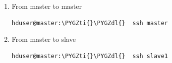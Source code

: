 \documentclass[letterpaper,10pt,english]{sphinxmanual}
\def\PYGZdl{\char`\$}
\def\PYGZti{\char`\~}
\begin{document}
\begin{enumerate}
\item {} 
From master to master

\begin{Verbatim}[commandchars=\\\{\}]
hduser@master:\PYGZti{}\PYGZdl{}  ssh master
\end{Verbatim}

\end{enumerate}
\begin{figure}[htbp]
\centering

\end{figure}
\begin{enumerate}
\setcounter{enumi}{1}
\item {} 
From master to slave

\begin{Verbatim}[commandchars=\\\{\}]
hduser@master:\PYGZti{}\PYGZdl{}  ssh slave1
\end{Verbatim}

\end{enumerate}
\begin{figure}[htbp]
\centering

\end{figure}
\end{document}
